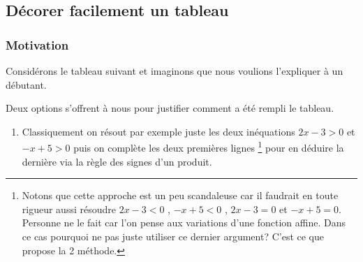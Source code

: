 \documentclass[12pt,a4paper]{book}
\theoremstyle{definition}
\begin{document}
{{\begin{latexex-alone}
\end{latexex-alone}
%

\subsection{Décorer facilement un tableau}

\subsubsection{Motivation}

Considérons le tableau suivant et imaginons que nous voulions l'expliquer à un débutant.

\begin{center}
	
\end{center}

Deux options s'offrent à nous pour justifier comment a été rempli le tableau.

\begin{enumerate}
    \item Classiquement on résout par exemple juste les deux inéquations $2 x - 3 > 0$ et $-x + 5 > 0$ puis on complète les deux premières lignes
    \footnote{
        Notons que cette approche est un peu scandaleuse car il faudrait en toute rigueur aussi résoudre
        $2 x - 3 < 0$ , $-x + 5 < 0$ , $2 x - 3 = 0$ et $-x + 5 = 0$.
        Personne ne le fait car l'on pense aux variations d'une fonction affine. Dans ce cas pourquoi ne pas juste utiliser ce dernier argument?
        C'est ce que propose la 2\ieme{} méthode.
    }
    pour en déduire la dernière via la règle des signes d'un produit.


\end{enumerate}}}
\end{document}

